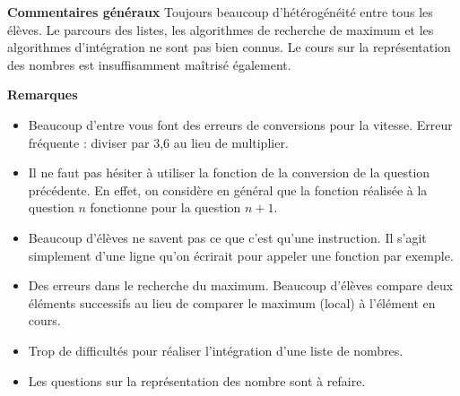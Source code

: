 \documentclass[10pt,fleqn]{article} %
\begin{document}

\pagestyle{fancy}
\thispagestyle{plain}


\def\columnseprulecolor{\color{ocre}}
\setlength{\columnseprule}{0.4pt} 



\vspace{6cm}


\textbf{Commentaires généraux}
Toujours beaucoup d'hétérogénéité entre tous les élèves. Le parcours des listes, les algorithmes de recherche de maximum et les algorithmes d’intégration ne sont pas bien connus. 
Le cours sur la représentation des nombres est insuffisamment maîtrisé également.


\textbf{Remarques}
\begin{itemize}
\item Beaucoup d'entre vous font des erreurs de conversions pour la vitesse. Erreur fréquente : diviser par 3,6 au lieu de multiplier.
\item Il ne faut pas hésiter à utiliser la fonction de la conversion de la question précédente. En effet, on considère en général que la fonction réalisée à la question $n$ fonctionne pour la question $n+1$.
\item Beaucoup d'élèves ne savent pas ce que c'est qu'une instruction. Il s'agit simplement d'une ligne qu'on écrirait pour appeler une fonction par exemple. 
\item Des erreurs dans le recherche du maximum. Beaucoup d'élèves compare deux éléments successifs au lieu de comparer le maximum (local) à l'élément en cours.
\item Trop de difficultés pour réaliser l'intégration d'une liste de nombres. 
\item Les questions sur la représentation des nombre sont à refaire. 
\end{itemize}






%
\end{document}
